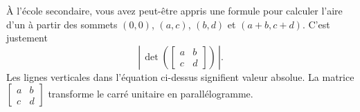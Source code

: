 À l’école secondaire, vous avez peut-être appris une formule pour calculer l’aire d'un  à partir des sommets
$(0,0)$, $(a,c)$, $(b,d)$
et $(a+b,c+d)$.  C’est justement
\begin{equation*}
\left\lvert \, \det \left(
\begin{bmatrix} a & b \\ c & d \end{bmatrix}
\right) \, \right\lvert.
\end{equation*}
Les lignes verticales dans l’équation ci-dessus signifient valeur absolue. La matrice $\left[ \begin{smallmatrix} a & b \\ c & d \end{smallmatrix}
\right]$
transforme le carré unitaire en parallélogramme.

\medskip

